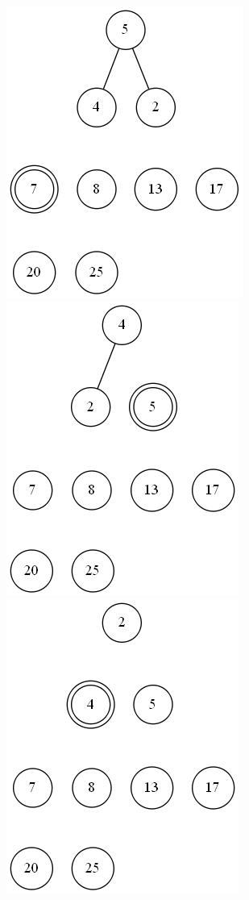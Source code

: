 \documentclass[a4paper]{article}
\begin{document}
\begin{enumerate}
\begin{changemargin}{-1cm}{-1cm}
\begin{center}
            \end{center}
            \vspace{0.5cm}
            \begin{center}
                \includegraphics[scale=0.3]{64-1g} \phantom{space}
                \includegraphics[scale=0.3]{64-1h} \phantom{space}
                \includegraphics[scale=0.3]{64-1i} 
            \end{center}
        \end{changemargin}


\end{enumerate}
\end{document}
